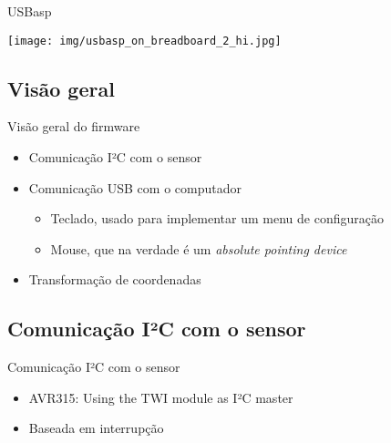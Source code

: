 \documentclass{beamer}
\begin{document}
\begin{frame}{USBasp}
	\begin{center}
		\texttt{[image: img/usbasp\_on\_breadboard\_2\_hi.jpg]}
	\end{center}
\end{frame}


\subsection{Visão geral}

\begin{frame}{Visão geral do firmware}
	\begin{itemize}
		\pause
		\item Comunicação I²C com o sensor
		\pause
		\item Comunicação USB com o computador
		\begin{itemize}
			\pause
			\item Teclado\pause, usado para implementar um menu de configuração
			\pause
			\item Mouse\pause, que na verdade é um \emph{absolute pointing device}
		\end{itemize}
		\pause
		\item Transformação de coordenadas
	\end{itemize}
\end{frame}


\subsection{Comunicação I²C com o sensor}

\begin{frame}{Comunicação I²C com o sensor}
	\pause
	\begin{itemize}[<+->]
		\item AVR315: Using the TWI module as I²C master
		\item Baseada em interrupção
	\end{itemize}
\end{frame}
\end{document}
